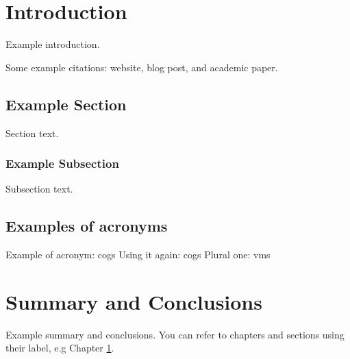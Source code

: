 \documentclass[12pt]{UIdahoMastersThesis}
\begin{document}
\mainmatter  %
\setcounter{secnumdepth}{3}  %




\clearpage
\chapter{Introduction}
\label{Chapter:Introduction}

Example introduction. 

Some example citations: website\cite{apache}, blog post\cite{lambert2015}, and academic paper\cite{Barham-2003}.  %

\section{Example Section}
Section text.
\subsection{Example Subsection}
Subsection text. 


\section{Examples of acronyms}
Example of acronym: \ac{cogs}
Using it again: \ac{cogs}
Plural one: \acp{vm}




\chapter{Summary and Conclusions}
\label{Chapter:SummaryAndConclusions}

Example summary and conclusions. You can refer to chapters and sections using their label, e.g Chapter \ref{Chapter:Introduction}.




\end{document}
